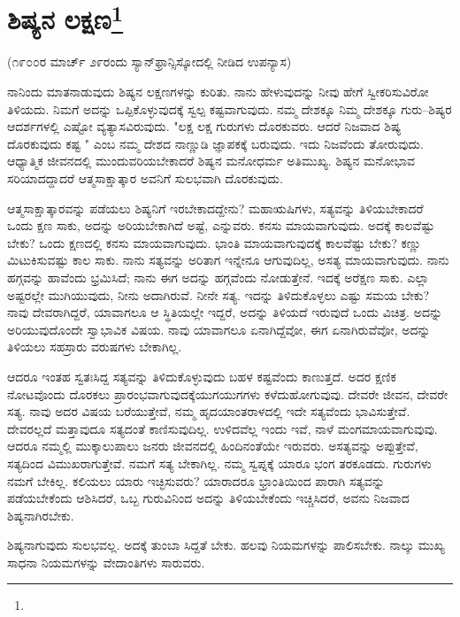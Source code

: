 
\chapter[ಶಿಷ್ಯನ ಲಕ್ಷಣ]{ಶಿಷ್ಯನ ಲಕ್ಷಣ\protect\footnote{}}

\begin{center}
(೧೯೦೦ರ ಮಾರ್ಚ್ ೨೯ರಂದು ಸ್ಯಾನ್‌ಫ್ರಾನ್ಸಿಸ್ಕೋದಲ್ಲಿ ನೀಡಿದ ಉಪನ್ಯಾಸ)
\end{center}

ನಾನಿಂದು ಮಾತನಾಡುವುದು ಶಿಷ್ಯನ ಲಕ್ಷಣಗಳನ್ನು ಕುರಿತು. ನಾನು ಹೇಳುವುದನ್ನು ನೀವು ಹೇಗೆ ಸ್ವೀಕರಿಸುವಿರೋ ತಿಳಿಯದು. ನಿಮಗೆ ಅದನ್ನು ಒಪ್ಪಿಕೊಳ್ಳುವುದಕ್ಕೆ ಸ್ವಲ್ಪ ಕಷ್ಟವಾಗುವುದು. ನಮ್ಮ ದೇಶಕ್ಕೂ ನಿಮ್ಮ ದೇಶಕ್ಕೂ ಗುರು–ಶಿಷ್ಯರ ಆದರ್ಶಗಳಲ್ಲಿ ಎಷ್ಟೋ ವ್ಯತ್ಯಾಸವಿರುವುದು. "ಲಕ್ಷ ಲಕ್ಷ ಗುರುಗಳು ದೊರಕುವರು. ಆದರೆ ನಿಜವಾದ ಶಿಷ್ಯ ದೊರಕುವುದು ಕಷ್ಟ " ಎಂಬ ನಮ್ಮ ದೇಶದ ನಾಣ್ಣುಡಿ ಜ್ಞಾಪಕಕ್ಕೆ ಬರುವುದು. ಇದು ನಿಜವೆಂದು ತೋರುವುದು. ಆಧ್ಯಾತ್ಮಿಕ ಜೀವನದಲ್ಲಿ ಮುಂದುವರಿಯಬೇಕಾದರೆ ಶಿಷ್ಯನ ಮನೋಧರ್ಮ ಅತಿಮುಖ್ಯ. ಶಿಷ್ಯನ ಮನೋಭಾವ ಸರಿಯಾದದ್ದಾದರೆ ಆತ್ಮಸಾಕ್ಷಾತ್ಕಾರ ಅವನಿಗೆ ಸುಲಭವಾಗಿ ದೊರಕುವುದು.

ಆತ್ಮಸಾಕ್ಷಾತ್ಕಾರವನ್ನು ಪಡೆಯಲು ಶಿಷ್ಯನಿಗೆ ಇರಬೇಕಾದದ್ದೇನು? ಮಹಾಋಷಿಗಳು, ಸತ್ಯವನ್ನು ತಿಳಿಯಬೇಕಾದರೆ ಒಂದು ಕ್ಷಣ ಸಾಕು, ಅದನ್ನು ಅರಿಯಬೇಕಾಗಿದೆ ಅಷ್ಟೆ, ಎನ್ನುವರು. ಕನಸು ಮಾಯವಾಗುವುದು. ಅದಕ್ಕೆ ಕಾಲವೆಷ್ಟು ಬೇಕು? ಒಂದು ಕ್ಷಣದಲ್ಲಿ ಕನಸು ಮಾಯವಾಗುವುದು. ಭಾಂತಿ ಮಾಯವಾಗುವುದಕ್ಕೆ ಕಾಲವೆಷ್ಟು ಬೇಕು? ಕಣ್ಣು ಮಿಟುಕಿಸುವಷ್ಟು ಕಾಲ ಸಾಕು. ನಾನು ಸತ್ಯವನ್ನು ಅರಿತಾಗ ಇನ್ನೇನೂ ಆಗುವುದಿಲ್ಲ, ಅಸತ್ಯ ಮಾಯವಾಗುವುದು. ನಾನು ಹಗ್ಗವನ್ನು ಹಾವೆಂದು ಭ್ರಮಿಸಿದೆ; ನಾನು ಈಗ ಅದನ್ನು ಹಗ್ಗವೆಂದು ನೋಡುತ್ತೇನೆ. ಇದಕ್ಕೆ ಅರೆಕ್ಷಣ ಸಾಕು. ಎಲ್ಲಾ ಅಷ್ಟರಲ್ಲೇ ಮುಗಿಯುವುದು, ನೀನು ಅದಾಗಿರುವೆ. ನೀನೇ ಸತ್ಯ. ಇದನ್ನು ತಿಳಿದುಕೊಳ್ಳಲು ಎಷ್ಟು ಸಮಯ ಬೇಕು? ನಾವು ದೇವರಾಗಿದ್ದರೆ, ಯಾವಾಗಲೂ ಆ ಸ್ಥಿತಿಯಲ್ಲೇ ಇದ್ದರೆ, ಅದನ್ನು ತಿಳಿಯದೆ ಇರುವುದೆ ಒಂದು ವಿಚಿತ್ರ. ಅದನ್ನು ಅರಿಯುವುದೊಂದೇ ಸ್ವಾಭಾವಿಕ ವಿಷಯ. ನಾವು ಯಾವಾಗಲೂ ಏನಾಗಿದ್ದೆವೋ, ಈಗ ಏನಾಗಿರುವೆವೋ, ಅದನ್ನು ತಿಳಿಯಲು ಸಹಸ್ರಾರು ವರುಷಗಳು ಬೇಕಾಗಿಲ್ಲ.

ಆದರೂ ಇಂತಹ ಸ್ವತಃಸಿದ್ದ ಸತ್ಯವನ್ನು ತಿಳಿದುಕೊಳ್ಳುವುದು ಬಹಳ ಕಷ್ಟವೆಂದು ಕಾಣುತ್ತದೆ. ಅದರ ಕ್ಷಣಿಕ ನೋಟವೊಂದು ದೊರಕಲು ಪ್ರಾರಂಭವಾಗುವುದಕ್ಕೆ\break ಯುಗಯುಗಗಳು ಕಳೆದುಹೋಗುವುವು. ದೇವರೇ ಜೀವನ, ದೇವರೇ ಸತ್ಯ. ನಾವು ಅದರ ವಿಷಯ ಬರೆಯುತ್ತೇವೆ, ನಮ್ಮ ಹೃದಯಾಂತರಾಳದಲ್ಲಿ ಇದೇ ಸತ್ಯವೆಂದು ಭಾವಿಸುತ್ತೇವೆ. ದೇವರಲ್ಲದೆ ಮತ್ತಾವುದೂ ಸತ್ಯದಂತೆ ಕಾಣಿಸುವುದಿಲ್ಲ. ಉಳಿದವೆಲ್ಲ ಇಂದು ಇವೆ, ನಾಳೆ ಮಂಗಮಾಯವಾಗುವುವು. ಆದರೂ ನಮ್ಮಲ್ಲಿ ಮುಕ್ಕಾಲುಪಾಲು ಜನರು ಜೀವನದಲ್ಲಿ ಹಿಂದಿನಂತೆಯೇ ಇರುವರು. ಅಸತ್ಯವನ್ನು ಅಪ್ಪುತ್ತೇವೆ, ಸತ್ಯದಿಂದ ವಿಮುಖರಾಗುತ್ತೇವೆ. ನಮಗೆ ಸತ್ಯ ಬೇಕಾಗಿಲ್ಲ. ನಮ್ಮ ಸ್ವಪ್ನಕ್ಕೆ ಯಾರೂ ಭಂಗ ತರಕೂಡದು. ಗುರುಗಳು ನಮಗೆ ಬೇಕಿಲ್ಲ. ಕಲಿಯಲು ಯಾರು ಇಚ್ಛಿಸುವರು? ಯಾರಾದರೂ ಭ್ರಾಂತಿಯಿಂದ ಪಾರಾಗಿ ಸತ್ಯವನ್ನು ಪಡೆಯಬೇಕೆಂದು ಆಶಿಸಿದರೆ, ಒಬ್ಬ ಗುರುವಿನಿಂದ ಅದನ್ನು ತಿಳಿಯಬೇಕೆಂದು ಇಚ್ಚಿಸಿದರೆ, ಅವನು ನಿಜವಾದ ಶಿಷ್ಯನಾಗಿರಬೇಕು.

ಶಿಷ್ಯನಾಗುವುದು ಸುಲಭವಲ್ಲ. ಅದಕ್ಕೆ ತುಂಬಾ ಸಿದ್ದತೆ ಬೇಕು. ಹಲವು ನಿಯಮಗಳನ್ನು ಪಾಲಿಸಬೇಕು. ನಾಲ್ಕು ಮುಖ್ಯ ಸಾಧನಾ ನಿಯಮಗಳನ್ನು ವೇದಾಂತಿಗಳು ಸಾರುವರು.


